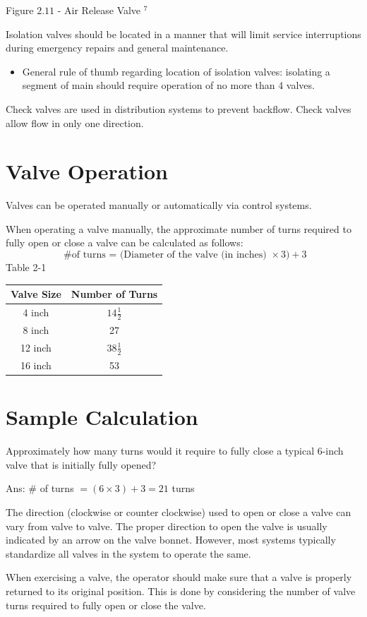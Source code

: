 \documentclass[10pt]{article}
\begin{document}
Figure $2.11$ - Air Release Valve ${ }^{7}$

Isolation valves should be located in a manner that will limit service interruptions during emergency repairs and general maintenance.

\begin{itemize}
  \item General rule of thumb regarding location of isolation valves: isolating a segment of main should require operation of no more than 4 valves.
\end{itemize}
Check valves are used in distribution systems to prevent backflow. Check valves allow flow in only one direction.

\section{Valve Operation}
Valves can be operated manually or automatically via control systems.

When operating a valve manually, the approximate number of turns required to fully open or close a valve can be calculated as follows:
$$
\text { \# of turns = (Diameter of the valve (in inches) } \times 3)+3
$$
Table 2-1

\begin{tabular}{|c|c|}
\hline
Valve Size & Number of Turns \\
\hline
4 inch & $14 \frac{1}{2}$ \\
8 inch & 27 \\
12 inch & $38 \frac{1}{2}$ \\
16 inch & 53 \\
\hline
\end{tabular}

\section{Sample Calculation}
Approximately how many turns would it require to fully close a typical 6-inch valve that is initially fully opened?

Ans: $\#$ of turns $=(6 \times 3)+3=21$ turns

The direction (clockwise or counter clockwise) used to open or close a valve can vary from valve to valve. The proper direction to open the valve is usually indicated by an arrow on the valve bonnet. However, most systems typically standardize all valves in the system to operate the same.

When exercising a valve, the operator should make sure that a valve is properly returned to its original position. This is done by considering the number of valve turns required to fully open or close the valve.
\end{document}
